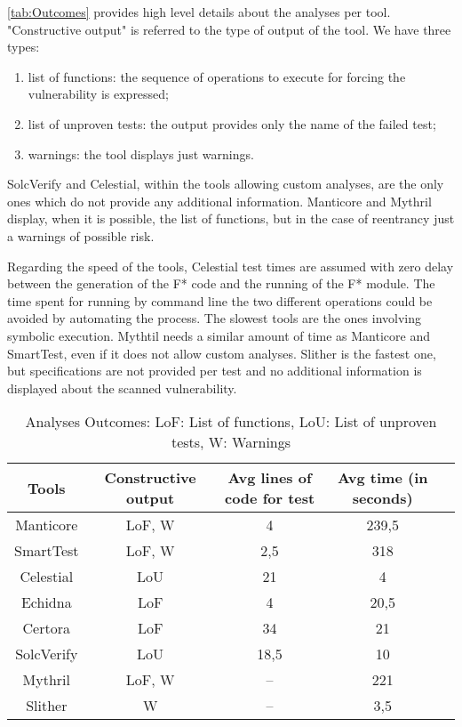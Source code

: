 \autoref{tab:Outcomes} provides high level details about the analyses per tool. 
"Constructive output" is referred to the type of output of the tool. 
We have three types:
\begin{enumerate}
    \item list of functions: the sequence of operations to execute for forcing the vulnerability is expressed;
    \item list of unproven tests: the output provides only the name of the failed test;
    \item warnings: the tool displays just warnings.
\end{enumerate}

SolcVerify and Celestial, within the tools allowing custom analyses, are the only ones which do not provide any additional information.
Manticore and Mythril display, when it is possible, the list of functions, but in the case of reentrancy just a warnings of possible risk.

Regarding the speed of the tools, Celestial test times are assumed with zero delay between the generation of the F* code and the running of the F* module.
The time spent for running by command line the two different operations could be avoided by automating the process.
The slowest tools are the ones involving symbolic execution. Mythtil needs a similar amount of time as Manticore and SmartTest, even if it does not allow custom analyses.
Slither is the fastest one, but specifications are not provided per test and no additional information is displayed about the scanned vulnerability.
\begin{center}
    \begin{table*}
        \footnotesize
        \caption{Analyses Outcomes: 
        LoF: List of functions, LoU: List of unproven tests, W: Warnings}
        \label{tab:Outcomes}
        \begin{tabular}{ccccc}
        \toprule
        Tools  & Constructive output &  Avg lines of code for test & Avg time (in seconds) \\
        \midrule
            Manticore & LoF, W  & 4  &  239,5 \\
            SmartTest & LoF, W & 2,5 &  318  \\
            Celestial & LoU & 21  &  4  \\
            Echidna & LoF  & 4  & 20,5 \\
            Certora & LoF   & 34 &  21  \\ 
            SolcVerify & LoU  &  18,5 &  10  \\
            Mythril & LoF, W  & --  &  221  \\ 
            Slither& W & --  &  3,5  \\ 
        \bottomrule
        \end{tabular}
    \end{table*}
\end{center}

